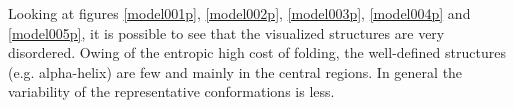 \medskip
\medskip
\medskip

Looking at figures \ref{model001p}, \ref{model002p}, \ref{model003p}, \ref{model004p} and \ref{model005p}, it is possible to see that the visualized structures are very disordered. Owing of the entropic high cost of folding, the well-defined structures (e.g. alpha-helix) are few and mainly in the central regions. In general the variability of the representative conformations is less. %
